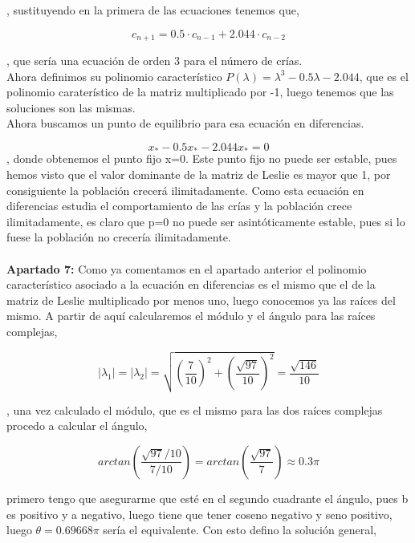 \documentclass{article}
\begin{document}
, sustituyendo en la primera de las ecuaciones tenemos que,

\begin{equation*}
c_{n+1}=0.5\cdot c_{n-1} + 2.044\cdot c_{n-2}
\end{equation*}

, que sería una ecuación de orden 3 para el número de crías. \\

Ahora definimos su polinomio característico $P(\lambda)=\lambda^3-0.5\lambda - 2.044$, que es el polinomio caraterístico de la matriz multiplicado por -1, luego tenemos que las soluciones son las mismas. \\

Ahora buscamos un punto de equilibrio para esa ecuación en diferencias.

\begin{equation*}
x_*-0.5x_*-2.044x_* = 0
\end{equation*}
, donde obtenemos el punto fijo x=0. Este punto fijo no puede ser estable, pues hemos visto que el valor dominante de la matriz de Leslie es mayor que 1, por consiguiente la población crecerá ilimitadamente. Como esta ecuación en diferencias estudia el comportamiento de las crías y la población crece ilimitadamente, es claro que p=0 no puede ser asintóticamente estable, pues si lo fuese la población no crecería ilimitadamente. \\ \\

\textbf{Apartado 7:} Como ya comentamos en el apartado anterior el polinomio característico asociado a la ecuación en diferencias es el mismo que el de la matriz de Leslie multiplicado por menos uno, luego conocemos ya las raíces del mismo. A partir de aquí calcularemos el módulo y el ángulo para las raíces complejas,

\begin{equation*}
|\lambda_1|=|\lambda_2| = \sqrt{(\frac{7}{10})^2 + (\frac{\sqrt{97}}{10})^2}=\frac{\sqrt{146}}{10}
\end{equation*}

, una vez calculado el módulo, que es el mismo para las dos raíces complejas procedo a calcular el ángulo,

\begin{equation*}
arctan(\frac{\sqrt{97}/10}{7/10})=arctan(\frac{\sqrt{97}}{7}) \approx 0.3\pi
\end{equation*}

primero tengo que asegurarme que esté en el segundo cuadrante el ángulo, pues b es positivo y a negativo, luego tiene que tener coseno negativo y seno positivo, luego $\theta = 0.69668\pi$ sería el equivalente. Con esto defino la solución general,
\end{document}
